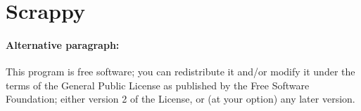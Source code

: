 
\section{Scrappy}
\paragraph{Alternative paragraph:} This program is free software; you can redistribute it and/or modify it under the terms of the  General Public License as published by the Free Software Foundation; either version 2 of the License, or (at your option) any later version.
